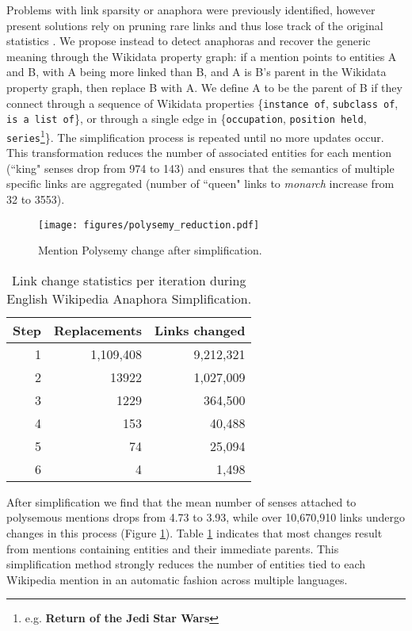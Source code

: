 \documentclass[letterpaper]{article}
\begin{document}
Problems with link sparsity or anaphora were previously identified, however present solutions rely on pruning rare links and thus lose track of the original statistics \cite{tagme,hasibi2016reproducibility,ling2015design}. We propose instead to detect anaphoras and recover the generic meaning through the Wikidata property graph: if a mention points to entities A and B, with A being more linked than B, and A is B's parent in the Wikidata property graph, then replace B with A. We define A to be the parent of B if they connect through a sequence of Wikidata properties \{{\tt instance of}, {\tt subclass of}, {\tt is a list of}\}, or through a single edge in \{{\tt occupation}, {\tt position held}, {\tt series}\footnote{e.g. \textbf{Return of the Jedi}  \textbf{Star Wars}}\}. The simplification process is repeated until no more updates occur. This transformation reduces the number of associated entities for each mention (``king" senses drop from 974 to 143) and ensures that the semantics of multiple specific links are aggregated (number of ``queen" links to {\em monarch} increase from 32 to 3553).
\begin{figure}[ht]
\centering
\texttt{[image: figures/polysemy\_reduction.pdf]}
\caption{Mention Polysemy change after simplification.}
\label{fig:polysemy}
\end{figure}

\begin{table}
\caption{Link change statistics per iteration during English Wikipedia Anaphora Simplification.}
\centering
\begin{tabular}{ |r|r|r|}
\hline
Step & Replacements & Links changed\\
\hline
1 & 1,109,408 &  9,212,321\\
2 & 13922 & 1,027,009 \\
3 & 1229 & 364,500\\
4 & 153 & 40,488\\
5 & 74 & 25,094\\
6 & 4 & 1,498\\
\hline
\end{tabular}
\label{table:polysemy}
\end{table}

After simplification we find that the mean number of senses attached to polysemous mentions drops from 4.73 to 3.93, while over 10,670,910 links undergo changes in this process (Figure \ref{fig:polysemy}). Table \ref{table:polysemy} indicates that most changes result from mentions containing entities and their immediate parents. This simplification method strongly reduces the number of entities tied to each Wikipedia mention in an automatic fashion across multiple languages.
\end{document}
